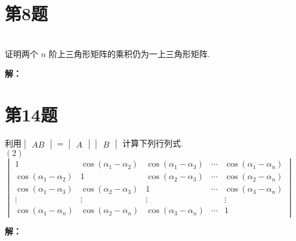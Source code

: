 \documentclass[a4paper, 12pt]{ctexart}
\begin{document}
\section{第8题}
\begin{exercise}~\\

 证明两个 $n$ 阶上三角形矩阵的乘积仍为一上三角形矩阵.
\end{exercise}

\noindent\textbf{解：}


\section{第14题}
\begin{exercise}
利用$\begin{vmatrix}
AB
\end{vmatrix} = 
\begin{vmatrix}
A
\end{vmatrix}
\begin{vmatrix}
B
\end{vmatrix}$
计算下列行列式.~\\

$(2)$ $\begin{vmatrix}
 1 & \cos(\alpha_{1}-\alpha_{2})  & \cos(\alpha_{1}-\alpha_{3}) & \cdots & \cos(\alpha_{1}-\alpha_{n})\\
 \cos(\alpha_{1}-\alpha_{2}) & 1 & \cos(\alpha_{2}-\alpha_{3}) & \cdots & \cos(\alpha_{2}-\alpha_{n})\\
 \cos(\alpha_{1}-\alpha_{3}) & \cos(\alpha_{2}-\alpha_{3}) & 1 & \cdots & \cos(\alpha_{3}-\alpha_{n})\\
 \vdots & \vdots & \vdots &  & \vdots\\
 \cos(\alpha_{1}-\alpha_{n}) & \cos(\alpha_{2}-\alpha_{n}) & \cos(\alpha_{3}-\alpha_{n}) & \cdots& 1
\end{vmatrix}$
\end{exercise}
\noindent\textbf{解：}
\end{document}
